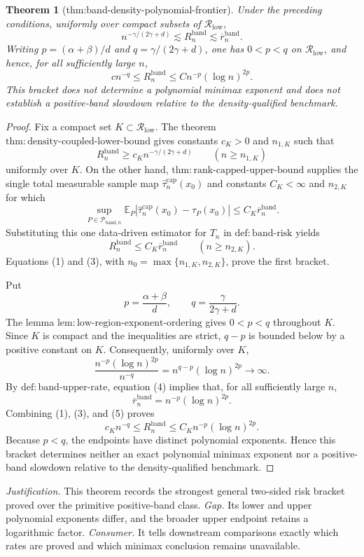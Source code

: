 \documentclass{article}
\newtheorem{theorem}{Theorem}
\begin{document}
\begin{theorem}[thm:band-density-polynomial-frontier]\label{thm:band-density-polynomial-frontier}
Under the preceding conditions, uniformly over compact subsets of \(\mathcal R_{\mathrm{low}}\),
\[
n^{-\gamma/(2\gamma+d)}\lesssim R_n^{\mathrm{band}}
\lesssim \overline r_n^{\mathrm{band}}.
\]
Writing \(p=(\alpha+\beta)/d\) and \(q=\gamma/(2\gamma+d)\), one has \(0<p<q\) on \(\mathcal R_{\mathrm{low}}\), and hence, for all sufficiently large \(n\),
\[
c n^{-q}\leq R_n^{\mathrm{band}}
\leq C n^{-p}(\log n)^{2p}.
\]
This bracket does not determine a polynomial minimax exponent and does not establish a positive-band slowdown relative to the density-qualified benchmark.
\end{theorem}
\begin{proof}
Fix a compact set \(K\subset\mathcal R_{\mathrm{low}}\).  The theorem
\(\mathrm{thm:density\mbox{-}coupled\mbox{-}lower\mbox{-}bound}\) gives
constants \(c_K>0\) and \(n_{1,K}\) such that
\[
R_n^{\mathrm{band}}\geq c_K n^{-\gamma/(2\gamma+d)}
\qquad(n\geq n_{1,K})
\tag{1}
\]
uniformly over \(K\).  On the other hand,
\(\mathrm{thm:rank\mbox{-}capped\mbox{-}upper\mbox{-}bound}\) supplies the
single total measurable sample map
\(\widehat\tau_n^{\mathrm{cap}}(x_0)\) and constants \(C_K<\infty\) and
\(n_{2,K}\) for which
\[
\sup_{P\in\mathcal P_{\mathrm{band},n}}
\mathbb E_P\left|
\widehat\tau_n^{\mathrm{cap}}(x_0)-\tau_P(x_0)
\right|
\leq C_K\overline r_n^{\mathrm{band}}.
\tag{2}
\]
Substituting this one data-driven estimator for \(T_n\) in
\(\mathrm{def:band\mbox{-}risk}\) yields
\[
R_n^{\mathrm{band}}\leq C_K\overline r_n^{\mathrm{band}}
\qquad(n\geq n_{2,K}).
\tag{3}
\]
Equations (1) and (3), with
\(n_0=\max\{n_{1,K},n_{2,K}\}\), prove the first bracket.

Put
\[
p=\frac{\alpha+\beta}{d},
\qquad
q=\frac{\gamma}{2\gamma+d}.
\]
The lemma
\(\mathrm{lem:low\mbox{-}region\mbox{-}exponent\mbox{-}ordering}\) gives
\(0<p<q\) throughout \(K\).  Since \(K\) is compact and the inequalities
are strict, \(q-p\) is bounded below by a positive constant on \(K\).
Consequently, uniformly over \(K\),
\[
\frac{n^{-p}(\log n)^{2p}}{n^{-q}}
=n^{q-p}(\log n)^{2p}\longrightarrow\infty.
\tag{4}
\]
By \(\mathrm{def:band\mbox{-}upper\mbox{-}rate}\), equation (4) implies
that, for all sufficiently large \(n\),
\[
\overline r_n^{\mathrm{band}}
=n^{-p}(\log n)^{2p}.
\tag{5}
\]
Combining (1), (3), and (5) proves
\[
c_Kn^{-q}\leq R_n^{\mathrm{band}}
\leq C_Kn^{-p}(\log n)^{2p}.
\]
Because \(p<q\), the endpoints have distinct polynomial exponents.  Hence
this bracket determines neither an exact polynomial minimax exponent nor a
positive-band slowdown relative to the density-qualified benchmark.
\end{proof}
\par\smallskip\noindent \textit{Justification.} This theorem records the strongest general two-sided risk bracket proved over the primitive positive-band class. \textit{Gap.} Its lower and upper polynomial exponents differ, and the broader upper endpoint retains a logarithmic factor. \textit{Consumer.} It tells downstream comparisons exactly which rates are proved and which minimax conclusion remains unavailable.
\end{document}
